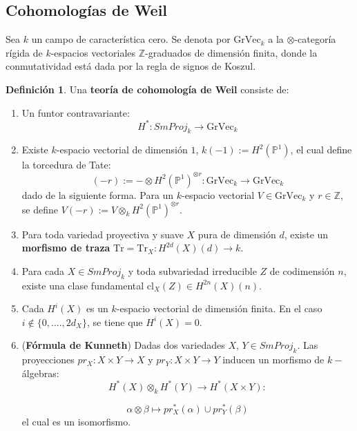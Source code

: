 \documentclass[10pt]{amsart}
\theoremstyle{definition}
\newtheorem{definition}{Definici\'on}[section]
\theoremstyle{remark}
\theoremstyle{definition}
\begin{document}
\subsection{Cohomologías de Weil}
Sea $\mathit{k}$ un campo de característica cero. Se denota por $\mathrm{GrVec}_{\mathit{k}}$ a la $\otimes$-categoría rígida de $\mathit{k}$-espacios vectoriales $\mathbb{Z}$-graduados de dimensión finita, donde la conmutatividad está dada por la regla de signos de Koszul.
\begin{definition} Una \textbf{teoría de cohomología de Weil} consiste de:
\begin{enumerate}
\item Un funtor contravariante:
\begin{equation*}
H^{*}:SmProj_{\mathit{k}} \rightarrow \mathrm{GrVec}_{\mathit{k}}
\end{equation*}
\item Existe $\mathit{k}$-espacio vectorial de dimensión $1$, $\mathit{k}(-1):=H^{2}(\mathbb{P}^1)$, el cual define la torcedura de Tate:
\begin{equation*}
(-r):=-\otimes H^2(\mathbb{P}^1)^{\otimes r}:\mathrm{GrVec}_{\mathit{k}} \rightarrow \mathrm{GrVec}_{\mathit{k}}
\end{equation*}
dado de la siguiente forma. Para un $\mathit{k}$-espacio vectorial $V \in \mathrm{GrVec}_{\mathit{k}}$ y $r \in \mathbb{Z}$, se define $V(-r):=V \otimes_{\mathit{k}} H^2(\mathbb{P}^1)^{\otimes r}$.
\item Para toda variedad proyectiva y suave $X$ pura de dimensión $d$, existe un \textbf{morfismo de traza} $ \mathrm{Tr}= \mathrm{Tr}_{X}:H^{2d}(X)(d) \rightarrow \mathit{k}$.
\item Para cada $X \in SmProj_{\mathit{k}}$ y toda subvariedad irreducible $Z$ de codimensión $n$, existe una clase fundamental $\mathrm{cl}_{X}(Z) \in H^{2n}(X)(n)$.
\item Cada $H^{i}(X)$ es un $\mathit{k}$-espacio vectorial de dimensión finita. En el caso $i \notin \{0,....,2d_{X}\}$, se tiene que $H^{i}(X)=0$.
\item (\textbf{Fórmula de Kunneth}) Dadas dos variedades $X$, $Y \in SmProj_{\mathit{k}}$. Las proyecciones $pr_{X}:X \times Y \rightarrow X$ y $pr_{Y}: X \times Y \rightarrow Y$ inducen un morfismo de $\mathit{k}-$álgebras:
\begin{equation*}
H^{*}(X) \otimes_{\mathit{k}} H^{*}(Y) \rightarrow H^{*}(X \times Y):
\end{equation*}

\begin{equation*}
\alpha \otimes\beta \mapsto pr^{*}_{X}(\alpha) \cup pr^{*}_{Y}(\beta)
\end{equation*}
el cual es un isomorfismo.


\end{enumerate}
\end{definition}
\end{document}
